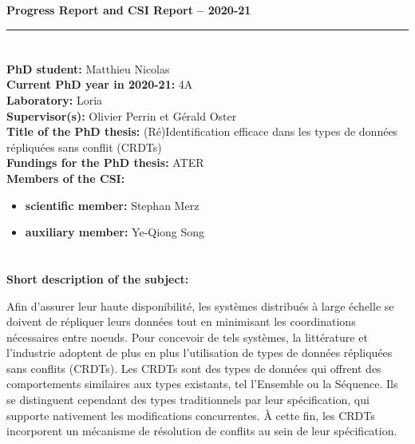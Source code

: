 \documentclass[12pt]{article}
\begin{document}
\hspace{-8.5mm} 

\bigskip

\centerline{\Large\textbf{Progress Report and CSI Report -- 2020-21}}
\bigskip
\bigskip

\bigskip
\hrule

\section*{}

\noindent\textbf{PhD student:}
Matthieu Nicolas
\\
\noindent\textbf{Current PhD year in 2020-21:}
4A
\\
\noindent\textbf{Laboratory:}
Loria
\\
\noindent\textbf{Supervisor(s):}
Olivier Perrin et Gérald Oster
\\
\noindent\textbf{Title of the PhD thesis:}
(Ré)Identification efficace dans les types de données répliquées sans conflit (CRDTs)
\\
\noindent\textbf{Fundings for the PhD thesis:}
ATER
\\

\noindent\textbf{Members of the CSI:}
\begin{itemize}
\item\textbf{scientific member:}
  Stephan Merz
\item\textbf{auxiliary member:}
  Ye-Qiong Song
\end{itemize}

\newpage
\section*{}

\noindent\textbf{Short description of the subject:}

Afin d'assurer leur haute disponibilité, les systèmes distribués à large échelle se doivent de répliquer leurs données tout en minimisant les coordinations nécessaires entre noeuds.
Pour concevoir de tels systèmes, la littérature et l'industrie adoptent de plus en plus l'utilisation de types de données répliquées sans conflits (CRDTs).
Les CRDTs sont des types de données qui offrent des comportements similaires aux types existants, tel l'Ensemble ou la Séquence.
Ils se distinguent cependant des types traditionnels par leur spécification, qui supporte nativement les modifications concurrentes.
À cette fin, les CRDTs incorporent un mécanisme de résolution de conflits au sein de leur spécification.
\end{document}

